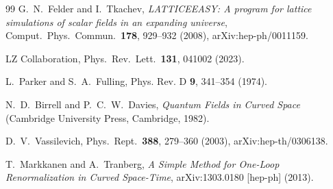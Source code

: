\documentclass[epj]{svjour}
\begin{document}
\begin{thebibliography}{99}
G.~N.~Felder and I.~Tkachev,
\textit{LATTICEEASY: A program for lattice simulations of scalar fields in an expanding universe},
Comput.\ Phys.\ Commun.\ \textbf{178}, 929--932 (2008),
arXiv:hep-ph/0011159.

LZ Collaboration,
Phys.\ Rev.\ Lett.\ \textbf{131}, 041002 (2023).


L.~Parker and S.~A.~Fulling,
Phys. Rev. D \textbf{9}, 341--354 (1974).

N.~D.~Birrell and P.~C.~W.~Davies,
\textit{Quantum Fields in Curved Space}
(Cambridge University Press, Cambridge, 1982).

D.~V.~Vassilevich,
Phys.\ Rept.\ \textbf{388}, 279--360 (2003),
arXiv:hep-th/0306138.

T.~Markkanen and A.~Tranberg,
\textit{A Simple Method for One-Loop Renormalization in Curved Space-Time},
arXiv:1303.0180 [hep-ph] (2013).

\end{thebibliography}
\end{document}
